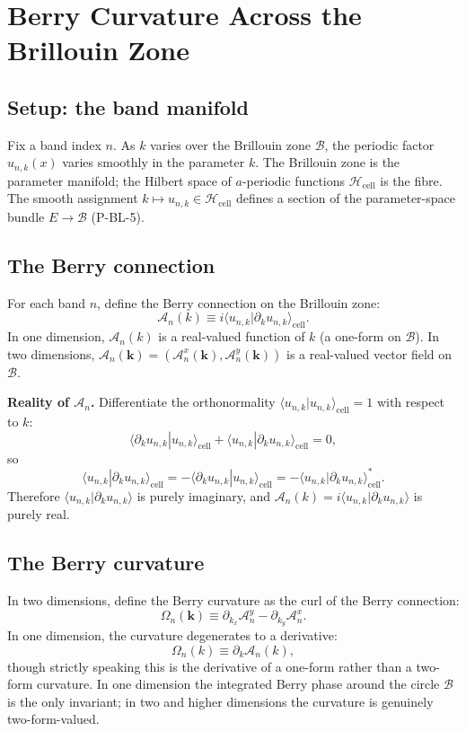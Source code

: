\documentclass[11pt,a4paper]{article}
\begin{document}
\section{Berry Curvature Across the Brillouin Zone}

\subsection{Setup: the band manifold}

Fix a band index $n$. As $k$ varies over the Brillouin zone $\mathcal{B}$, the periodic factor $u_{n,k}(x)$ varies smoothly in the parameter $k$. The Brillouin zone is the parameter manifold; the Hilbert space of $a$-periodic functions $\mathcal{H}_{\mathrm{cell}}$ is the fibre. The smooth assignment $k \mapsto u_{n,k} \in \mathcal{H}_{\mathrm{cell}}$ defines a section of the parameter-space bundle $E \to \mathcal{B}$ (P-BL-5).

\subsection{The Berry connection}

For each band $n$, define the Berry connection on the Brillouin zone:
\[
\mathcal{A}_n(k) \equiv i \langle u_{n,k} | \partial_k u_{n,k}\rangle_{\mathrm{cell}}.
\]
In one dimension, $\mathcal{A}_n(k)$ is a real-valued function of $k$ (a one-form on $\mathcal{B}$). In two dimensions, $\mathcal{A}_n(\mathbf{k}) = (\mathcal{A}_n^x(\mathbf{k}), \mathcal{A}_n^y(\mathbf{k}))$ is a real-valued vector field on $\mathcal{B}$.

\textbf{Reality of $\mathcal{A}_n$.} Differentiate the orthonormality $\langle u_{n,k}|u_{n,k}\rangle_{\mathrm{cell}} = 1$ with respect to $k$:
\[
\langle \partial_k u_{n,k} | u_{n,k}\rangle_{\mathrm{cell}} + \langle u_{n,k} | \partial_k u_{n,k}\rangle_{\mathrm{cell}} = 0,
\]
so
\[
\langle u_{n,k} | \partial_k u_{n,k}\rangle_{\mathrm{cell}} = -\langle \partial_k u_{n,k} | u_{n,k}\rangle_{\mathrm{cell}} = -\langle u_{n,k} | \partial_k u_{n,k}\rangle_{\mathrm{cell}}^*.
\]
Therefore $\langle u_{n,k}|\partial_k u_{n,k}\rangle$ is purely imaginary, and $\mathcal{A}_n(k) = i\langle u_{n,k}|\partial_k u_{n,k}\rangle$ is purely real.

\subsection{The Berry curvature}

In two dimensions, define the Berry curvature as the curl of the Berry connection:
\[
\Omega_n(\mathbf{k}) \equiv \partial_{k_x} \mathcal{A}_n^y - \partial_{k_y} \mathcal{A}_n^x.
\]
In one dimension, the curvature degenerates to a derivative:
\[
\Omega_n(k) \equiv \partial_k \mathcal{A}_n(k),
\]
though strictly speaking this is the derivative of a one-form rather than a two-form curvature. In one dimension the integrated Berry phase around the circle $\mathcal{B}$ is the only invariant; in two and higher dimensions the curvature is genuinely two-form-valued.
\end{document}

